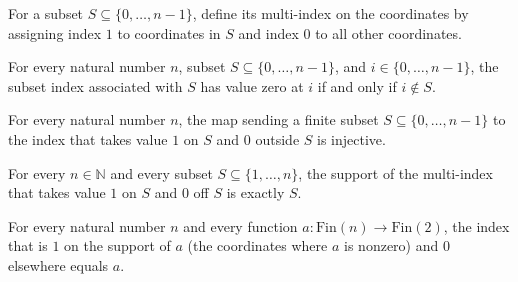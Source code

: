 \begin{definition}
\label{FABL.subsetMultiIndex}
\leanok
{}
For a subset $S\subseteq\{0,\ldots,n-1\}$, define its multi-index on the coordinates by
assigning index $1$ to coordinates in $S$ and index $0$ to all other coordinates.
\end{definition}

\begin{theorem}
\label{FABL.subsetMultiIndex_eq_zero_iff}
\leanok
{}
For every natural number $n$, subset $S\subseteq\{0,\ldots,n-1\}$, and
$i\in\{0,\ldots,n-1\}$, the subset index associated with $S$ has value zero at $i$ if
and only if $i\notin S$.
\end{theorem}

\begin{theorem}
\label{FABL.subsetMultiIndex_injective}
\leanok
{}
For every natural number $n$, the map sending a finite subset
$S\subseteq\{0,\ldots,n-1\}$ to the index that takes value $1$ on $S$ and $0$ outside
$S$ is injective.
\end{theorem}

\begin{theorem}
\label{FABL.signMultiIndexSupport_subsetMultiIndex}
\leanok
{}
For every $n\in\mathbb N$ and every subset $S\subseteq\{1,\ldots,n\}$, the support of
the multi-index that takes value $1$ on $S$ and $0$ off $S$ is exactly $S$.
\end{theorem}

\begin{theorem}
\label{FABL.subsetMultiIndex_signMultiIndexSupport}
\leanok
{}
For every natural number $n$ and every function $a:\mathrm{Fin}(n)\to\mathrm{Fin}(2)$,
the index that is $1$ on the support of $a$ (the coordinates where $a$ is nonzero) and
$0$ elsewhere equals $a$.
\end{theorem}

